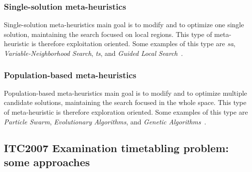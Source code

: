 \subsubsection{Single-solution meta-heuristics}
Single-solution meta-heuristics main goal is to modify and to optimize one single solution, maintaining the search focused on local regions. This type of meta-heuristic is therefore exploitation oriented. Some examples of this type are \textit{\gls{sa}}, \textit{Variable-Neighborhood Search}, \textit{\gls{ts}}, and \textit{Guided Local Search}~\cite{Talbi2009}. 

\subsubsection{Population-based meta-heuristics}
Population-based meta-heuristics main goal is to modify and to optimize multiple candidate solutions, maintaining the search focused in the whole space. This type of meta-heuristic is therefore exploration oriented. Some examples of this type are \textit{Particle Swarm}, \textit{Evolutionary Algorithms}, and \textit{Genetic Algorithms}~\cite{Talbi2009}.

\subsection{ITC2007 Examination timetabling problem: some approaches}
\label{subsection:ApprITC2007}

